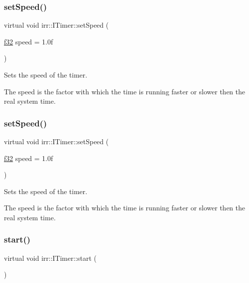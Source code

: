 \subsubsection{\texorpdfstring{set\+Speed()}{setSpeed()}\hspace{0.1cm}{\footnotesize\ttfamily [1/2]}}
{\footnotesize\ttfamily virtual void irr\+::\+I\+Timer\+::set\+Speed (\begin{DoxyParamCaption}\item[{\hyperlink{namespaceirr_a0277be98d67dc26ff93b1a6a1d086b07}{f32}}]{speed = {\ttfamily 1.0f} }\end{DoxyParamCaption})\hspace{0.3cm}{\ttfamily [pure virtual]}}



Sets the speed of the timer. 

The speed is the factor with which the time is running faster or slower then the real system time. \mbox{\label{classirr_1_1ITimer_a13f3f4919a3431733bc90cd87d110675}} 
\subsubsection{\texorpdfstring{set\+Speed()}{setSpeed()}\hspace{0.1cm}{\footnotesize\ttfamily [2/2]}}
{\footnotesize\ttfamily virtual void irr\+::\+I\+Timer\+::set\+Speed (\begin{DoxyParamCaption}\item[{\hyperlink{namespaceirr_a0277be98d67dc26ff93b1a6a1d086b07}{f32}}]{speed = {\ttfamily 1.0f} }\end{DoxyParamCaption})\hspace{0.3cm}{\ttfamily [pure virtual]}}



Sets the speed of the timer. 

The speed is the factor with which the time is running faster or slower then the real system time. \mbox{\label{classirr_1_1ITimer_a9467dc5a72de3869712715d0473c9697}} 
\subsubsection{\texorpdfstring{start()}{start()}\hspace{0.1cm}{\footnotesize\ttfamily [1/2]}}
{\footnotesize\ttfamily virtual void irr\+::\+I\+Timer\+::start (\begin{DoxyParamCaption}{ }\end{DoxyParamCaption})\hspace{0.3cm}{\ttfamily [pure virtual]}}



